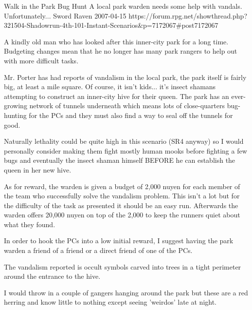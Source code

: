 \begin{scenario}{Walk in the Park}
	{Bug Hunt}
	{A local park warden needs some help with vandals. Unfortunately...}
	{Sword Raven}
	{2007-04-15}
	{https://forum.rpg.net/showthread.php?321504-Shadowrun-4th-101-Instant-Scenarios\&p=7172067#post7172067}

A kindly old man who has looked after this inner-city park for a long time. Budgeting changes mean that he no longer has many park rangers to help out with more difficult tasks.

\synopsis Mr. Porter has had reports of vandalism in the local park, the park itself is fairly big, at least a mile square. Of course, it isn't kids... it's insect shamans attempting to construct an inner-city hive for their queen. The park has an ever-growing network of tunnels underneath which means lots of close-quarters bug-hunting for the PCs and they must also find a way to seal off the tunnels for good.

\notes Naturally lethality could be quite high in this scenario (SR4 anyway) so I would personally consider making them fight mostly human mooks before fighting a few bugs and eventually the insect shaman himself BEFORE he can establish the queen in her new hive.

As for reward, the warden is given a budget of 2,000 nuyen for each member of the team who successfully solve the vandalism problem. This isn't a lot but for the difficulty of the task as presented it should be an easy run. Afterwards the warden offers 20,000 nuyen on top of the 2,000 to keep the runners quiet about what they found.

In order to hook the PCs into a low initial reward, I suggest having the park warden a friend of a friend or a direct friend of one of the PCs.

The vandalism reported is occult symbols carved into trees in a tight perimeter around the entrance to the hive.

I would throw in a couple of gangers hanging around the park but these are a red herring and know little to nothing except seeing 'weirdos' late at night. 

\end{scenario}